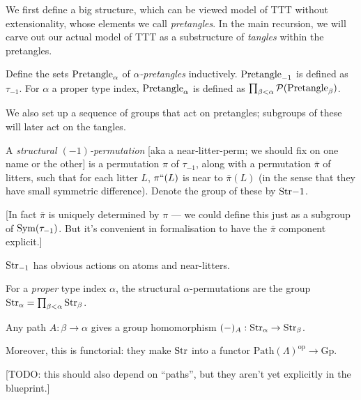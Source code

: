 We first define a big structure, which can be viewed model of TTT without extensionality, whose elements we call \emph{pretangles}.  In the main recursion, we will carve out our actual model of TTT as a substructure of \emph{tangles} within the pretangles.

\begin{definition}
  \label{def:pretangle}
  \leanok
  Define the sets $\mathrm{Pretangle}_\alpha$ of \emph{$\alpha$-pretangles} inductively. $\mathrm{Pretangle}_{-1}$ is defined as $\tau_{-1}$. For $\alpha$ a proper type index, $\mathrm{Pretangle}_\alpha$ is defined as $\prod_{\beta < \alpha} \mathcal{P}(\mathrm{Pretangle}_\beta)$.
\end{definition}

We also set up a sequence of groups that act on pretangles; subgroups of these will later act on the tangles.

\begin{definition}
  \label{def:structural-perm-atoms}
  \leanok

  A \emph{structural $(-1)$-permutation} [aka a near-litter-perm; we should fix on one name or the other] is a permutation $\pi$ of $\tau_{-1}$, along with a permutation $\bar{\pi}$ of litters, such that for each litter $L$, $\pi``(L)$ is near to $\bar{\pi}(L)$ (in the sense that they have small symmetric difference).  Denote the group of these by $\mathrm{Str}{-1}$.

  [In fact $\bar{\pi}$ is uniquely determined by $\pi$ — we could define this just as a subgroup of $\mathrm{Sym}(\tau_{-1})$.  But it’s convenient in formalisation to have the $\bar{\pi}$ component explicit.]

  $\mathrm{Str}_{-1}$ has obvious actions on atoms and near-litters.
\end{definition}

\begin{definition}
  \label{def:structural-perm}
  For a \emph{proper} type index $\alpha$, the structural $\alpha$-permutations are the group $\mathrm{Str}_\alpha = \prod_{\beta < \alpha} \mathrm{Str}_\beta$.
\end{definition}

\begin{definition}
  \label{def:structural-perm-derivative}
  Any path $A : \beta \to \alpha$ gives a group homomorphism $(-)_A : \mathrm{Str}_\alpha \to \mathrm{Str}_\beta$.

  Moreover, this is functorial: they make $\mathrm{Str}$ into a functor $\mathrm{Path}(\Lambda)^\mathrm{op} \to \mathrm{Gp}$.

  [TODO: this should also depend on “paths”, but they aren’t yet explicitly in the blueprint.]
\end{definition}

